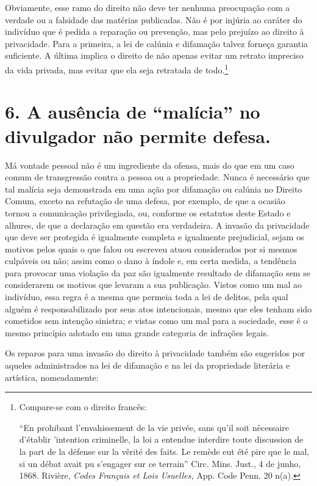 Obviamente, esse ramo do direito não deve ter nenhuma preocupação com a
verdade ou a falsidade das matérias publicadas. Não é por injúria ao
caráter do indivíduo que é pedida a reparação ou prevenção, mas pelo
prejuízo ao direito à privacidade. Para a primeira, a lei de calúnia e
difamação talvez forneça garantia suficiente. A última implica o direito
de não apenas evitar um retrato impreciso da vida privada, mas evitar
que ela seja retratada de todo.\footnote{Compare-se com o direito
  francês:

  ``En prohibant l'envahissement de la vie privée, sans qu'il soit
  nêcessaire d'établir 'intention criminelle, la loi a entendue
  interdire toute discussion de la part de la défense sur la vêrité des
  faits. Le remède eut été pire que le mal, si un débat avait pu
  s'engager sur ce terrain'' Circ. Mins. Just., 4 de junho, 1868.
  Rivière, \emph{Codes Français et Lois Usuelles,} App. Code Penn. 20
  n(a).}

\section{6. A ausência de ``malícia'' no divulgador não permite defesa.}

Má vontade pessoal não é um ingrediente da ofensa, mais do que em um
caso comum de transgressão contra a pessoa ou a propriedade. Nunca é
necessário que tal malícia seja demonstrada em uma ação por difamação ou
calúnia no Direito Comum, exceto na refutação de uma defesa, por
exemplo, de que a ocasião tornou a comunicação privilegiada, ou,
conforme os estatutos deste Estado e alhures, de que a declaração em
questão era verdadeira. A invasão da privacidade que deve ser protegida
é igualmente completa e igualmente prejudicial, sejam os motivos pelos
quais o que falou ou escreveu atuou considerados por si mesmos culpáveis
ou não; assim como o dano à índole e, em certa medida, a tendência para
provocar uma violação da paz são igualmente resultado de difamação sem
se considerarem os motivos que levaram a sua publicação. Vistos como um
mal ao indivíduo, essa regra é a mesma que permeia toda a lei de
delitos, pela qual alguém é responsabilizado por seus atos intencionais,
mesmo que eles tenham sido cometidos sem intenção sinistra; e vistas
como um mal para a sociedade, esse é o mesmo princípio adotado em uma
grande categoria de infrações legais.

Os reparos para uma invasão do direito à privacidade também são
sugeridos por aqueles administrados na lei de difamação e na lei da
propriedade literária e artística, nomeadamente:

